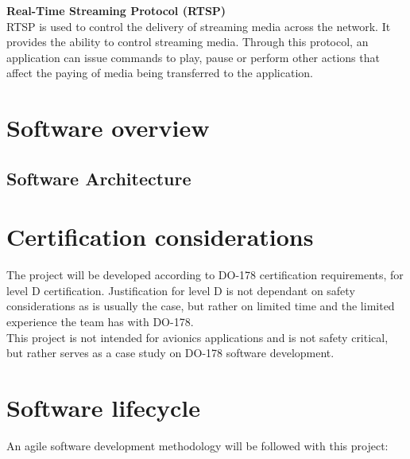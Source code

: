 \documentclass[a4paper]{article}
\begin{document}
\textbf{Real-Time Streaming Protocol (RTSP)\\}
RTSP is used to control the delivery of streaming media across the network. It provides the ability to control streaming media. Through this protocol, an application can issue commands to play, pause or perform other actions that affect the paying of media being transferred to the application.
\newpage

\section{Software overview}
\subsection{Software Architecture}
\newpage


\section{Certification considerations}
The project will be developed according to DO-178 certification requirements, for level D certification. Justification for level D is not dependant on safety considerations as is usually the case, but rather on limited time and the limited experience the team has with DO-178.\\
This project is not intended for avionics applications and is not safety critical, but rather serves as a case study on DO-178 software development.\\
\newpage

\section{Software lifecycle}
An agile software development methodology will be followed with this project:\\
\end{document}
